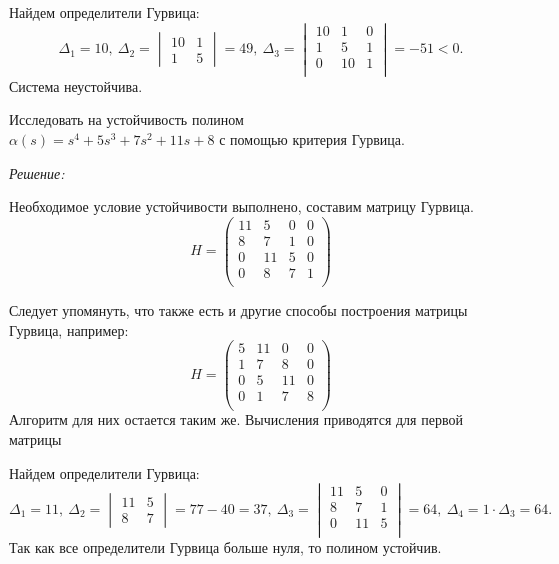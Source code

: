 \documentclass[../../TAU.tex]{subfiles}
\begin{document}
    Найдем определители Гурвица: 
    $$
    \Delta_1=10,\ \Delta_2 = 
    \begin{vmatrix}
        10 & 1\\
        1  & 5
    \end{vmatrix}
    =49,\ \Delta_3=
    \begin{vmatrix}
        10 & 1 & 0\\
        1  & 5 & 1\\
        0 & 10 & 1\\
    \end{vmatrix}
    =-51<0.
    $$
    Система неустойчива.

    \examp Исследовать на устойчивость полином\\
    $\alpha(s) = s^4+5s^3+7s^2+11s+8$ 
    с помощью критерия Гурвица.

    {\it Решение:}\par
    Необходимое условие устойчивости выполнено, составим матрицу Гурвица.
    $$
        H = 
        \begin{pmatrix}
            11 & 5  & 0 & 0 \\
            8  & 7  & 1 & 0 \\
            0  & 11 & 5 & 0 \\
            0  & 8  & 7 & 1 \\
        \end{pmatrix}
    $$

    Следует упомянуть, что также есть и другие способы построения матрицы Гурвица, например:
    $$
        H = 
        \begin{pmatrix}
            5 & 11 & 0  & 0 \\
            1 & 7  & 8  & 0 \\
            0 & 5  & 11 & 0 \\
            0 & 1  & 7  & 8 \\
        \end{pmatrix}
    $$
    Алгоритм для них остается таким же. Вычисления приводятся для первой матрицы

    Найдем определители Гурвица: 
    $$
    \Delta_1=11,\ \Delta_2 = 
    \begin{vmatrix}
        11 & 5\\
        8  & 7
    \end{vmatrix}
    =77 - 40=37,\ \Delta_3=
    \begin{vmatrix}
        11 & 5 & 0\\
        8  & 7 & 1\\
        0 & 11 & 5\\
    \end{vmatrix}
    =64,\ \Delta_4=1 \cdot \Delta_3=64.
    $$
    Так как все определители Гурвица больше нуля, то полином устойчив. 
\end{document}
